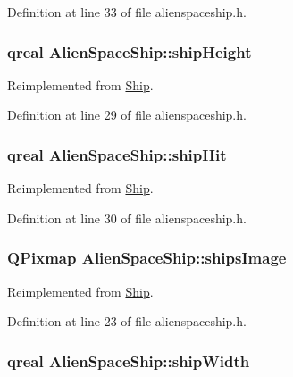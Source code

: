 Definition at line 33 of file alienspaceship.h.\hypertarget{class_alien_space_ship_a2d4ed13f6240af32719ffcaa25d6586b}{
\subsubsection[{shipHeight}]{\setlength{\rightskip}{0pt plus 5cm}qreal {\bf AlienSpaceShip::shipHeight}}}
\label{class_alien_space_ship_a2d4ed13f6240af32719ffcaa25d6586b}


Reimplemented from \hyperlink{class_ship_a16205aae21b89c3fb57960a70be931a2}{Ship}.

Definition at line 29 of file alienspaceship.h.\hypertarget{class_alien_space_ship_a1834c3be5efc26ca49451a3b04ec8785}{
\subsubsection[{shipHit}]{\setlength{\rightskip}{0pt plus 5cm}qreal {\bf AlienSpaceShip::shipHit}}}
\label{class_alien_space_ship_a1834c3be5efc26ca49451a3b04ec8785}


Reimplemented from \hyperlink{class_ship_a1fd726a67e6b11d5ce19f4657db40237}{Ship}.

Definition at line 30 of file alienspaceship.h.\hypertarget{class_alien_space_ship_abab065a55af3cfac98529eeec94190f8}{
\subsubsection[{shipsImage}]{\setlength{\rightskip}{0pt plus 5cm}QPixmap {\bf AlienSpaceShip::shipsImage}}}
\label{class_alien_space_ship_abab065a55af3cfac98529eeec94190f8}


Reimplemented from \hyperlink{class_ship_a3e61137191ddd959a57e0cd8928b4873}{Ship}.

Definition at line 23 of file alienspaceship.h.\hypertarget{class_alien_space_ship_a752697ea2f71e8d4675c694ac242e6f9}{
\subsubsection[{shipWidth}]{\setlength{\rightskip}{0pt plus 5cm}qreal {\bf AlienSpaceShip::shipWidth}}}
\label{class_alien_space_ship_a752697ea2f71e8d4675c694ac242e6f9}


